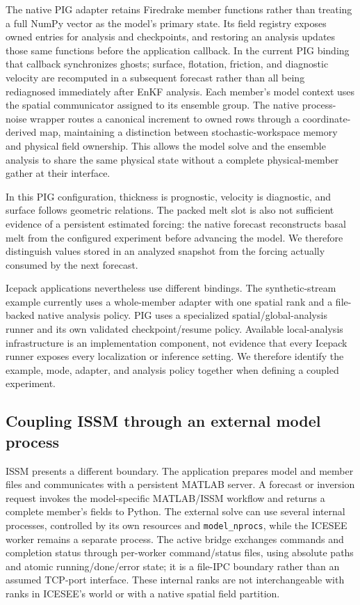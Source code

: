 \documentclass[11pt,a4paper]{article}
\newcommand{\code}[1]{\nolinkurl{#1}}
\begin{document}
The native PIG adapter retains Firedrake member functions rather than treating a full NumPy vector as the model's primary state. Its field registry exposes owned entries for analysis and checkpoints, and restoring an analysis updates those same functions before the application callback. In the current PIG binding that callback synchronizes ghosts; surface, flotation, friction, and diagnostic velocity are recomputed in a subsequent forecast rather than all being rediagnosed immediately after EnKF analysis. Each member's model context uses the spatial communicator assigned to its ensemble group. The native process-noise wrapper routes a canonical increment to owned rows through a coordinate-derived map, maintaining a distinction between stochastic-workspace memory and physical field ownership. This allows the model solve and the ensemble analysis to share the same physical state without a complete physical-member gather at their interface.

In this PIG configuration, thickness is prognostic, velocity is diagnostic, and surface follows geometric relations. The packed melt slot is also not sufficient evidence of a persistent estimated forcing: the native forecast reconstructs basal melt from the configured experiment before advancing the model. We therefore distinguish values stored in an analyzed snapshot from the forcing actually consumed by the next forecast.

Icepack applications nevertheless use different bindings. The synthetic-stream example currently uses a whole-member adapter with one spatial rank and a file-backed native analysis policy. PIG uses a specialized spatial/global-analysis runner and its own validated checkpoint/resume policy. Available local-analysis infrastructure is an implementation component, not evidence that every Icepack runner exposes every localization or inference setting. We therefore identify the example, mode, adapter, and analysis policy together when defining a coupled experiment.

\subsection{Coupling ISSM through an external model process}
ISSM presents a different boundary. The application prepares model and member files and communicates with a persistent MATLAB server. A forecast or inversion request invokes the model-specific MATLAB/ISSM workflow and returns a complete member's fields to Python. The external solve can use several internal processes, controlled by its own resources and \code{model_nprocs}, while the ICESEE worker remains a separate process. The active bridge exchanges commands and completion status through per-worker command/status files, using absolute paths and atomic running/done/error state; it is a file-IPC boundary rather than an assumed TCP-port interface. These internal ranks are not interchangeable with ranks in ICESEE's world or with a native spatial field partition.
\end{document}
